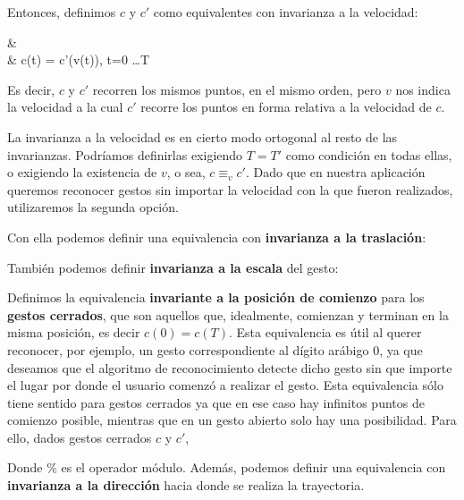 
Entonces, definimos $c$ y $c'$ como equivalentes con invarianza a la velocidad:

{
& \existsv \\
&  c(t) = c'(v(t)), \; t=0 \dots T
}

Es decir, $c$ y $c'$ recorren los mismos puntos, en el mismo orden, pero $v$ nos indica la velocidad a la cual $c'$ recorre los puntos en forma relativa a la velocidad de $c$. 

La invarianza a la velocidad es en cierto modo ortogonal al resto de las invarianzas. Podríamos definirlas exigiendo $T=T'$ como condición en todas ellas, o exigiendo la existencia de $v$, o sea, $c \equiv_v c'$. Dado que en nuestra aplicación queremos reconocer gestos sin importar la velocidad con la que fueron realizados, utilizaremos la segunda opción. 



Con ella podemos definir una equivalencia con \textbf{invarianza a la traslación}:






También podemos definir \textbf{invarianza a la escala} del gesto:

Definimos la equivalencia \textbf{invariante a la posición de comienzo} para los \textbf{gestos cerrados}, que son aquellos que, idealmente, comienzan y terminan en la misma posición, es decir $c(0)=c(T)$. Esta equivalencia es útil al querer reconocer, por ejemplo, un gesto correspondiente al dígito arábigo $0$, ya que deseamos que el algoritmo de reconocimiento detecte dicho gesto sin que importe el lugar por donde el usuario comenzó a realizar el gesto. Esta equivalencia sólo tiene sentido para gestos cerrados ya que en ese caso hay infinitos puntos de comienzo posible, mientras que en un gesto abierto solo hay una posibilidad. Para ello, dados gestos cerrados $c$ y $c'$, 

Donde $\%$ es el operador módulo. Además, podemos definir una equivalencia con \textbf{invarianza a la dirección} hacia donde se realiza la trayectoria.

